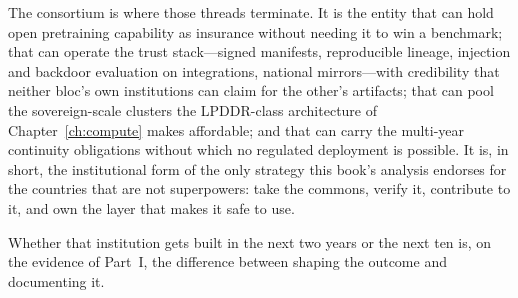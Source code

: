 The consortium is where those threads terminate. It is the entity that can hold open pretraining capability as insurance without needing it to win a benchmark; that can operate the trust stack---signed manifests, reproducible lineage, injection and backdoor evaluation on integrations, national mirrors---with credibility that neither bloc's own institutions can claim for the other's artifacts; that can pool the sovereign-scale clusters the LPDDR-class architecture of Chapter~\ref{ch:compute} makes affordable; and that can carry the multi-year continuity obligations without which no regulated deployment is possible. It is, in short, the institutional form of the only strategy this book's analysis endorses for the countries that are not superpowers: take the commons, verify it, contribute to it, and own the layer that makes it safe to use.

Whether that institution gets built in the next two years or the next ten is, on the evidence of Part~I, the difference between shaping the outcome and documenting it.
